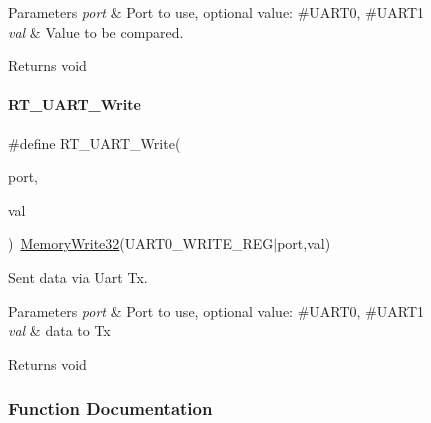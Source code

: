 \begin{DoxyParams}{Parameters}
{\em port} & Port to use, optional value\+: \#\+U\+A\+R\+T0, \#\+U\+A\+R\+T1 \\
\hline
{\em val} & Value to be compared. \\
\hline
\end{DoxyParams}
\begin{DoxyReturn}{Returns}
void 
\end{DoxyReturn}
\mbox{\label{a00056_a3c30d4d2e260d1c2f96747e9d7bdaf0d}} 
\paragraph{\texorpdfstring{R\+T\+\_\+\+U\+A\+R\+T\+\_\+\+Write}{RT\_UART\_Write}}
{\footnotesize\ttfamily \#define R\+T\+\_\+\+U\+A\+R\+T\+\_\+\+Write(\begin{DoxyParamCaption}\item[{}]{port,  }\item[{}]{val }\end{DoxyParamCaption})~\mbox{\hyperlink{a00020_ad9953f631a539cfaa35baf94f878b3ec}{Memory\+Write32}}(U\+A\+R\+T0\+\_\+\+W\+R\+I\+T\+E\+\_\+\+R\+EG$\vert$port,val)}



Sent data via Uart Tx. 


\begin{DoxyParams}{Parameters}
{\em port} & Port to use, optional value\+: \#\+U\+A\+R\+T0, \#\+U\+A\+R\+T1 \\
\hline
{\em val} & data to Tx \\
\hline
\end{DoxyParams}
\begin{DoxyReturn}{Returns}
void 
\end{DoxyReturn}


\subsubsection{Function Documentation}
\mbox{\label{a00056_abc136df9d66fe27bf8ffcc319246591e}} 
